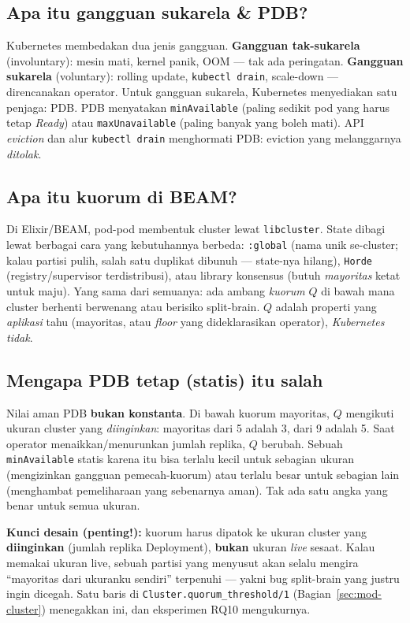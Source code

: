 \documentclass[11pt]{article}
\newcommand{\code}[1]{\texttt{\small #1}}
\newcommand{\istilah}[1]{\textbf{#1}}
\begin{document}
\subsection{Apa itu gangguan sukarela \& PDB?}
Kubernetes membedakan dua jenis gangguan. \istilah{Gangguan tak-sukarela} (involuntary): mesin mati,
kernel panik, OOM --- tak ada peringatan. \istilah{Gangguan sukarela} (voluntary): rolling update,
\code{kubectl drain}, scale-down --- direncanakan operator. Untuk gangguan sukarela, Kubernetes
menyediakan satu penjaga: PDB. PDB menyatakan \code{minAvailable} (paling sedikit pod yang harus tetap
\emph{Ready}) atau \code{maxUnavailable} (paling banyak yang boleh mati). API \emph{eviction} dan alur
\code{kubectl drain} menghormati PDB: eviction yang melanggarnya \emph{ditolak}.

\subsection{Apa itu kuorum di BEAM?}
Di Elixir/BEAM, pod-pod membentuk cluster lewat \code{libcluster}. State dibagi lewat berbagai cara
yang kebutuhannya berbeda: \code{:global} (nama unik se-cluster; kalau partisi pulih, salah satu
duplikat dibunuh --- state-nya hilang), \code{Horde} (registry/supervisor terdistribusi), atau library
konsensus (butuh \emph{mayoritas} ketat untuk maju). Yang sama dari semuanya: ada ambang \emph{kuorum}
$Q$ di bawah mana cluster berhenti berwenang atau berisiko split-brain. $Q$ adalah properti yang
\emph{aplikasi} tahu (mayoritas, atau \emph{floor} yang dideklarasikan operator), \emph{Kubernetes
tidak}.

\subsection{Mengapa PDB tetap (statis) itu salah}
\label{sec:why-static}
Nilai aman PDB \textbf{bukan konstanta}. Di bawah kuorum mayoritas, $Q$ mengikuti ukuran cluster yang
\emph{diinginkan}: mayoritas dari 5 adalah 3, dari 9 adalah 5. Saat operator menaikkan/menurunkan
jumlah replika, $Q$ berubah. Sebuah \code{minAvailable} statis karena itu bisa terlalu kecil untuk
sebagian ukuran (mengizinkan gangguan pemecah-kuorum) atau terlalu besar untuk sebagian lain
(menghambat pemeliharaan yang sebenarnya aman). Tak ada satu angka yang benar untuk semua ukuran.

\istilah{Kunci desain (penting!):} kuorum harus dipatok ke ukuran cluster yang \textbf{diinginkan}
(jumlah replika Deployment), \textbf{bukan} ukuran \emph{live} sesaat. Kalau memakai ukuran live, sebuah
partisi yang menyusut akan selalu mengira ``mayoritas dari ukuranku sendiri'' terpenuhi --- yakni bug
split-brain yang justru ingin dicegah. Satu baris di \code{Cluster.quorum\_threshold/1} (Bagian~\ref{sec:mod-cluster})
menegakkan ini, dan eksperimen RQ10 mengukurnya.
\end{document}
